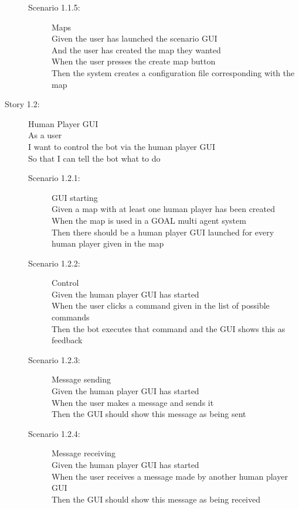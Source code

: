 \documentclass{article}
\begin{document}
\begin{description}
\begin{description}
    \item[Scenario 1.1.5:] Maps\\
    Given the user has launched the scenario GUI\\
    And the user has created the map they wanted\\
    When the user presses the create map button\\
    Then the system creates a configuration file corresponding with the map
  \end{description}
  \item[Story 1.2:] Human Player GUI\\
  As a user \\
  I want to control the bot via the human player GUI\\
  So that I can tell the bot what to do

  \begin{description}
    \item[Scenario 1.2.1:] GUI starting\\
    Given a map with at least one human player has been created\\
    When the map is used in a GOAL multi agent system\\
    Then there should be a human player GUI launched for every human player given in the map
    
    \item[Scenario 1.2.2:] Control\\
    Given the human player GUI has started\\
    When the user clicks a command given in the list of possible commands\\
    Then the bot executes that command and the GUI shows this as feedback

    \item[Scenario 1.2.3:] Message sending\\
    Given the human player GUI has started\\
    When the user makes a message and sends it\\
    Then the GUI should show this message as being sent
    
    \item[Scenario 1.2.4:] Message receiving\\
    Given the human player GUI has started\\
    When the user receives a message made by another human player GUI\\
    Then the GUI should show this message as being received


\end{description}
\end{description}
\end{document}
